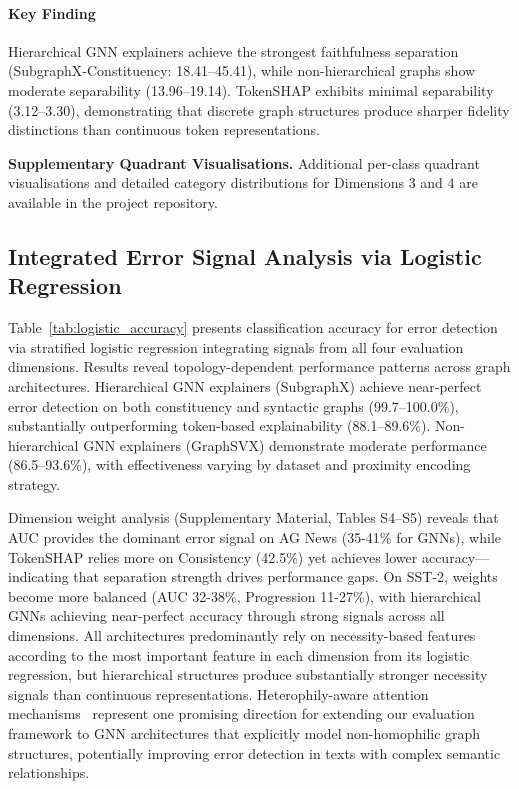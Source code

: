 \documentclass[preprint, times, review, 10pt]{elsarticle}
\begin{document}
\paragraph{\textbf{Key Finding}}
Hierarchical GNN explainers achieve the strongest faithfulness separation (SubgraphX-Constituency: 18.41–45.41), while non-hierarchical graphs show moderate separability (13.96–19.14). TokenSHAP exhibits minimal separability (3.12–3.30), demonstrating that discrete graph structures produce sharper fidelity distinctions than continuous token representations.


\vspace{0.5em}
\noindent\textbf{Supplementary Quadrant Visualisations.} Additional per-class quadrant visualisations and detailed category distributions for Dimensions 3 and 4 are available in the project repository.
\vspace{0.5em}

\subsection{Integrated Error Signal Analysis via Logistic Regression} \label{sec:logistic}

Table~\ref{tab:logistic_accuracy} presents classification accuracy for error detection via stratified logistic regression integrating signals from all four evaluation dimensions. Results reveal topology-dependent performance patterns across graph architectures. Hierarchical GNN explainers (SubgraphX) achieve near-perfect error detection on both constituency and syntactic graphs (99.7--100.0\%), substantially outperforming token-based explainability (88.1--89.6\%). Non-hierarchical GNN explainers (GraphSVX) demonstrate moderate performance (86.5--93.6\%), with effectiveness varying by dataset and proximity encoding strategy.

Dimension weight analysis (Supplementary Material, Tables S4--S5) reveals that AUC provides the dominant error signal on AG News (35-41\% for GNNs), while TokenSHAP relies more on Consistency (42.5\%) yet achieves lower accuracy—indicating that separation strength drives performance gaps. On SST-2, weights become more balanced (AUC 32-38\%, Progression 11-27\%), with hierarchical GNNs achieving near-perfect accuracy through strong signals across all dimensions. All architectures predominantly rely on necessity-based features according to the most important feature in each dimension from its logistic regression, but hierarchical structures produce substantially stronger necessity signals than continuous representations. Heterophily-aware attention mechanisms~\cite{wang2025hagat} represent one promising direction for extending our evaluation framework to GNN architectures that explicitly model non-homophilic graph structures, potentially improving error detection in texts with complex semantic relationships.
\end{document}

